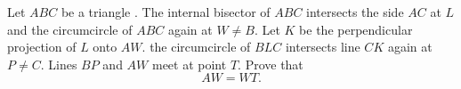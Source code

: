 Let $ABC$ be a triangle . The internal bisector of $ABC$ intersects the side $AC$ at $ L$ and the circumcircle of $ABC$ again at $W \neq B.$ Let $K$ be the perpendicular projection of $L$ onto $AW.$ the circumcircle of $BLC$ intersects  line $CK$ again at $P \neq C.$ Lines $BP$ and $AW$ meet at point $T.$ Prove that $$AW=WT.$$
